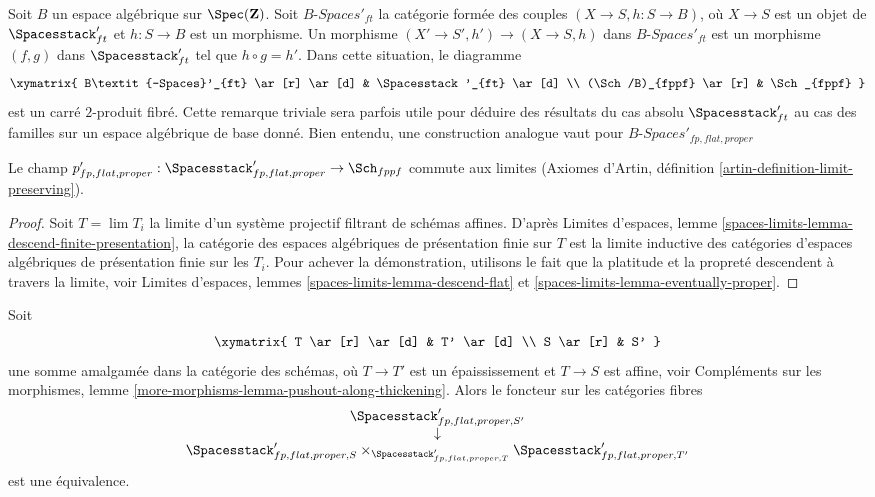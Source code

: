 \begin{remark}
\label{remark-spaces-base-change}
Soit $B$ un espace algébrique sur $\Spec(\mathbf{Z})$.
Soit $B\textit{-Spaces}'_{ft}$ la catégorie formée des couples
$(X \to S, h : S \to B)$, où $X \to S$ est un objet de
$\Spacesstack'_{ft}$ et $h : S \to B$ est un morphisme.
Un morphisme $(X' \to S', h') \to (X \to S, h)$ dans
$B\textit{-Spaces}'_{ft}$ est un morphisme $(f, g)$ dans
$\Spacesstack'_{ft}$ tel que $h \circ g = h'$.
Dans cette situation, le diagramme
$$
\xymatrix{
B\textit{-Spaces}'_{ft} \ar[r] \ar[d] & \Spacesstack'_{ft} \ar[d] \\
(\Sch/B)_{fppf} \ar[r] & \Sch_{fppf}
}
$$
est un carré $2$-produit fibré. Cette remarque triviale sera parfois utile
pour déduire des résultats du cas absolu $\Spacesstack'_{ft}$ au cas des
familles sur un espace algébrique de base donné.
Bien entendu, une construction analogue vaut pour
$B\textit{-Spaces}'_{fp, flat, proper}$
\end{remark}

\begin{lemma}
\label{lemma-spaces-limits}
Le champ
$p'_{fp, flat, proper} :
\Spacesstack'_{fp, flat, proper} \to \Sch_{fppf}$ commute aux limites
(Axiomes d'Artin, définition \ref{artin-definition-limit-preserving}).
\end{lemma}

\begin{proof}
Soit $T = \lim T_i$ la limite d'un système projectif filtrant de schémas
affines. D'après Limites d'espaces, lemme
\ref{spaces-limits-lemma-descend-finite-presentation},
la catégorie des espaces algébriques de présentation finie sur $T$ est la
limite inductive des catégories d'espaces algébriques de présentation finie
sur les $T_i$.
Pour achever la démonstration, utilisons le fait que la platitude et la
propreté descendent à travers la limite, voir
Limites d'espaces, lemmes
\ref{spaces-limits-lemma-descend-flat} et
\ref{spaces-limits-lemma-eventually-proper}.
\end{proof}

\begin{lemma}
\label{lemma-spaces-RS-star}
Soit
$$
\xymatrix{
T \ar[r] \ar[d] & T' \ar[d] \\
S \ar[r] & S'
}
$$
une somme amalgamée dans la catégorie des schémas, où
$T \to T'$ est un épaississement et $T \to S$ est affine, voir
Compléments sur les morphismes, lemme
\ref{more-morphisms-lemma-pushout-along-thickening}.
Alors le foncteur sur les catégories fibres
$$
\begin{matrix}
\Spacesstack'_{fp, flat, proper, S'} \\
\downarrow \\
\Spacesstack'_{fp, flat, proper, S}
\times_{\Spacesstack'_{fp, flat, proper, T}}
\Spacesstack'_{fp, flat, proper, T'}
\end{matrix}
$$
est une équivalence.
\end{lemma}

